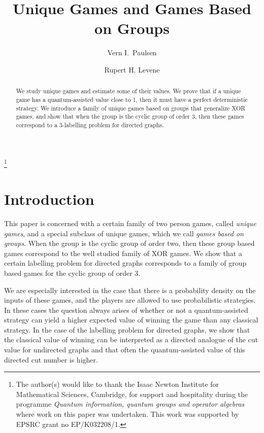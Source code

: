 \documentclass[11pt]{amsart}
\theoremstyle{definition}
\begin{document}
\title[]{Unique Games and Games Based on Groups}

\author[V.~I.~Paulsen]{Vern I.~Paulsen}
\address{Institute for Quantum Computing and Department of Pure Mathematics, University of Waterloo,
Waterloo, ON, Canada  N2L 3G1}
\author[R.~H.~Levene]{Rupert H. Levene}
\address{School of Mathematics \&\ Statistics and Centre for Quantum Engineering, Science \&\ Technology, University College Dublin, Dublin 4, Ireland}
\thanks{The author(s) would like to thank the Isaac Newton Institute for Mathematical Sciences, Cambridge, for support and hospitality during the programme {\it Quantum information, quantum groups and operator algebras} where work on this paper was undertaken. This work was supported by EPSRC grant no EP/K032208/1.}

\begin{abstract} We study unique games and estimate some of their values. We prove that if a unique game has a quantum-assisted value close to 1, then it must have a perfect deterministic strategy. We introduce a family of unique games based on groups that generalize XOR games, and show that when the group is the cyclic group of order 3, then these games correspond to a 3-labelling problem for directed graphs.
\end{abstract}
\maketitle

\section{Introduction}

 This paper is concerned with a certain family of two person games, called {\it unique games}, and a special subclass of unique games, which we call {\it games based on groups}. When the group is the cyclic group of order two, then these group based games correspond to the well studied family of XOR games. We show that a certain labelling problem for directed graphs corresponds to a family of group based games for the cyclic group of order 3.
 
 We are especially interested in the case that there is a probability density on the inputs of these games, and the players are allowed to use probabilistic strategies. In these cases the question always arises of whether or not a quantum-assisted strategy can yield a higher expected value of winning the game than any classical strategy. In the case of the labelling problem for directed graphs, we show that the classical value of winning can be interpreted as a directed analogue of the cut value for undirected graphs and that often the quantum-assisted value of this directed cut number is higher.
 
\end{document}
